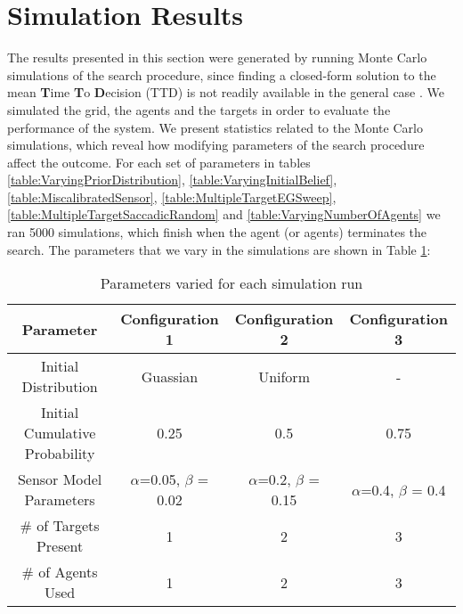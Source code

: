 \section{Simulation Results}



The results presented in this section were generated by running Monte Carlo simulations of the search procedure, since finding a closed-form solution to the mean \textbf{T}ime \textbf{T}o \textbf{D}ecision (TTD) is not readily available in the general case \cite{Chung2012AnalysisStrategies}. We simulated the grid, the agents and the targets in order to evaluate the performance of the system.
We present statistics related to the Monte Carlo simulations, which reveal how modifying parameters of the search procedure affect the outcome. For each set of parameters in tables \ref{table:VaryingPriorDistribution}, \ref{table:VaryingInitialBelief}, \ref{table:MiscalibratedSensor}, \ref{table:MultipleTargetEGSweep}, \ref{table:MultipleTargetSaccadicRandom} and \ref{table:VaryingNumberOfAgents} we ran 5000 simulations, which finish when the agent (or agents) terminates the search. The parameters that we vary in the simulations are shown in Table \ref{table:SimRunParameters}: 

\begin{table}[H]
    \centering
    \begin{tabular}{|c|c|c|c|}
    \hline
         Parameter& Configuration 1 & Configuration 2 & Configuration 3 \\
         \hline
         Initial Distribution & Guassian & Uniform & - \\
         
         \hline
         Initial Cumulative Probability & 0.25 & 0.5 & 0.75 \\
         
         \hline
         Sensor Model Parameters & $\alpha$=0.05, $\beta$ = 0.02 & $\alpha$=0.2, $\beta$ = 0.15 &
         $\alpha$=0.4, $\beta$ = 0.4 \\
         
         \hline
         \# of Targets Present & 1 & 2 & 3 \\
         
         \hline
         \# of Agents Used & 1 & 2 & 3 \\
         
         \hline
    \end{tabular}
    \caption{Parameters varied for each simulation run}
    \label{table:SimRunParameters}
\end{table}

